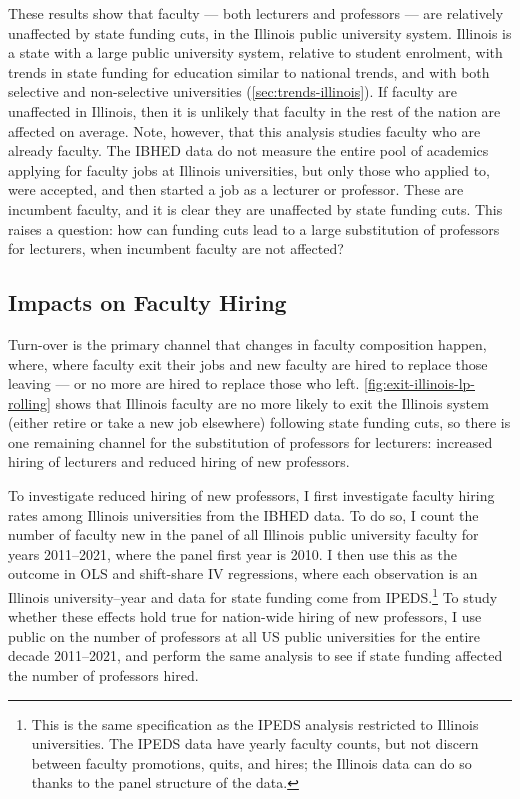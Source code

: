 These results show that faculty --- both lecturers and professors --- are relatively unaffected by state funding cuts, in the Illinois public university system.
Illinois is a state with a large public university system, relative to student enrolment, with trends in state funding for education similar to national trends, and with both selective and non-selective universities (\autoref{sec:trends-illinois}).
If faculty are unaffected in Illinois, then it is unlikely that faculty in the rest of the nation are affected on average.
Note, however, that this analysis studies faculty who are already faculty.
The IBHED data do not measure the entire pool of academics applying for faculty jobs at Illinois universities, but only those who applied to, were accepted, and then started a job as a lecturer or professor.
These are incumbent faculty, and it is clear they are unaffected by state funding cuts.
This raises a question: how can funding cuts lead to a large substitution of professors for lecturers, when incumbent faculty are not affected?

\subsection{Impacts on Faculty Hiring}
Turn-over is the primary channel that changes in faculty composition happen, where, where faculty exit their jobs and new faculty are hired to replace those leaving --- or no more are hired to replace those who left.
\autoref{fig:exit-illinois-lp-rolling} shows that Illinois faculty are no more likely to exit the Illinois system (either retire or take a new job elsewhere) following state funding cuts, so there is one remaining channel for the substitution of professors for lecturers: increased hiring of lecturers and reduced hiring of new professors.

To investigate reduced hiring of new professors, I first investigate faculty hiring rates among Illinois universities from the IBHED data.
To do so, I count the number of faculty new in the panel of all Illinois public university faculty for years 2011--2021, where the panel first year is 2010.
I then use this as the outcome in OLS and shift-share IV regressions, where each observation is an Illinois university--year and data for state funding come from IPEDS.\footnote{
    This is the same specification as the IPEDS analysis restricted to Illinois universities.
    The IPEDS data have yearly faculty counts, but not discern between faculty promotions, quits, and hires; the Illinois data can do so thanks to the panel structure of the data.
}
To study whether these effects hold true for nation-wide hiring of new professors, I use public on the number of professors at all US public universities for the entire decade 2011--2021, and perform the same analysis to see if state funding affected the number of professors hired.

